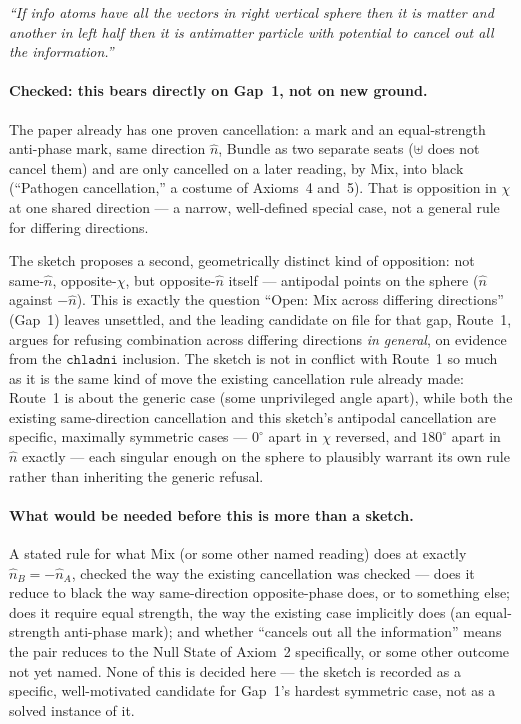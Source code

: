 \documentclass[11pt]{article}
\begin{document}
\emph{``If info atoms have all the vectors in right vertical sphere
then it is matter and another in left half then it is antimatter
particle with potential to cancel out all the information.''}

\paragraph{Checked: this bears directly on Gap~1, not on new ground.}
The paper already has one proven cancellation: a mark and an
equal-strength anti-phase mark, same direction $\hat n$, Bundle as
two separate seats ($\uplus$ does not cancel them) and are only
cancelled on a later reading, by Mix, into black (``Pathogen
cancellation,'' a costume of Axioms~4 and~5). That is opposition in
$\chi$ at one shared direction --- a narrow, well-defined special
case, not a general rule for differing directions.

The sketch proposes a second, geometrically distinct kind of
opposition: not same-$\hat n$, opposite-$\chi$, but opposite-$\hat n$
itself --- antipodal points on the sphere ($\hat n$ against $-\hat
n$). This is exactly the question ``Open: Mix across differing
directions'' (Gap~1) leaves unsettled, and the leading candidate on
file for that gap, Route~1, argues for refusing combination across
differing directions \emph{in general}, on evidence from the
$\mathtt{chladni}$ inclusion. The sketch is not in conflict with
Route~1 so much as it is the same kind of move the existing
cancellation rule already made: Route~1 is about the generic case
(some unprivileged angle apart), while both the existing
same-direction cancellation and this sketch's antipodal cancellation
are specific, maximally symmetric cases --- $0^\circ$ apart in $\chi$
reversed, and $180^\circ$ apart in $\hat n$ exactly --- each singular
enough on the sphere to plausibly warrant its own rule rather than
inheriting the generic refusal.

\paragraph{What would be needed before this is more than a sketch.}
A stated rule for what Mix (or some other named reading) does at
exactly $\hat n_B=-\hat n_A$, checked the way the existing
cancellation was checked --- does it reduce to black the way
same-direction opposite-phase does, or to something else; does it
require equal strength, the way the existing case implicitly does
(an equal-strength anti-phase mark); and whether ``cancels out all
the information'' means the pair reduces to the Null State of
Axiom~2 specifically, or some other outcome not yet named. None of
this is decided here --- the sketch is recorded as a specific,
well-motivated candidate for Gap~1's hardest symmetric case, not as
a solved instance of it.
\end{document}
